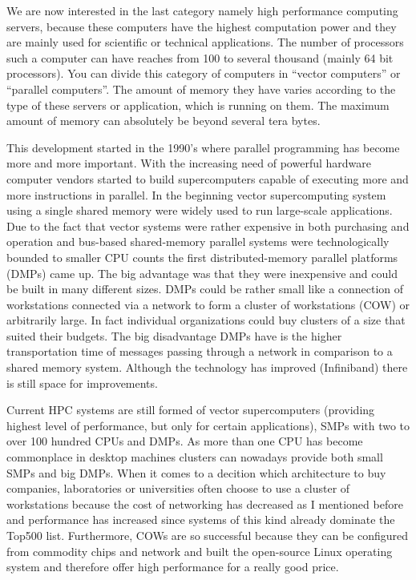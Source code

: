 We are now interested in the last category namely high performance
computing servers, because these computers have the highest
computation power and they are mainly used
for scientific or technical applications. The number of processors
such a computer can have reaches from 100 to several thousand (mainly
64 bit processors).
You can divide this category of computers in ``vector computers'' or ``parallel
computers''. The amount of memory they have varies according to the type of
these servers or application, which is running on them. The maximum
amount of memory can absolutely be beyond several tera bytes.  

This development started in the 1990's where parallel programming has
become more and more important. With the increasing need of powerful
hardware computer vendors started to build supercomputers capable of
executing more and more instructions in parallel. In the beginning
vector supercomputing system using a single shared memory were widely
used to run large-scale applications. Due to the fact that vector
systems were rather expensive in both purchasing and operation and
bus-based shared-memory parallel systems were technologically bounded
to smaller CPU counts the first distributed-memory parallel platforms (DMPs)
came up. The big advantage was that they were inexpensive and could be
built in many different sizes. DMPs could be rather small like a
connection of workstations connected via a network to form a cluster of
workstations (COW) or arbitrarily large. In fact individual
organizations could buy clusters of a size that suited their
budgets. The big disadvantage DMPs have is the higher transportation
time of messages passing through a network in comparison to a shared
memory system. Although the technology has improved (Infiniband) there
is still space for improvements. 

Current HPC systems are still formed of vector supercomputers
(providing highest level of performance, but only for certain
applications), SMPs with two to over 100 hundred CPUs and DMPs. As
more than one CPU has become commonplace in desktop machines clusters
can nowadays provide both small SMPs and big DMPs. When it comes to a
decition which architecture to buy companies, laboratories or
universities often choose to use a cluster of workstations because the
cost of networking has decreased as I mentioned before and performance
has increased since systems of this kind already dominate the Top500
list. Furthermore, COWs are so successful because they can be
configured from commodity chips and network and built the open-source
Linux operating system and therefore offer high performance for a
really good price.

